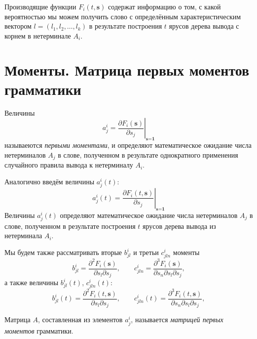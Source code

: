\documentclass[12pt]{article}
\begin{document}
\hrulefill

\begin{footnotesize}
Производящие функции $F_i(t, \textbf{s})$ содержат информацию о том, с какой вероятностью мы можем получить слово с определённым характеристическим вектором $l = (l_1, l_2, \ldots, l_k)$ в результате построения $t$ ярусов дерева вывода с корнем в нетерминале $A_i$.
\end{footnotesize}

\hrulefill

\section{Моменты. Матрица первых моментов грамматики}

Величины
\begin{equation}
	a^i_j = \left.\frac{\partial F_i(\textbf{s})}{\partial s_j}\right|_{\textbf{s} = \textbf{1}}
\end{equation}
называеются \textit{первыми моментами}, и определяют математическое ожидание числа нетерминалов $A_j$ в слове, полученном в результате однократного применения случайного правила вывода к нетерминалу $A_i$.

Аналогично введём величины $a^i_j(t)$:
\begin{equation}
	a^i_j(t) = \left.\frac{\partial F_i(t, \textbf{s})}{\partial s_j}\right|_{\textbf{s} = \textbf{1}}
\end{equation}
Величины $a^i_j(t)$ определяют математическое ожидание числа нетерминалов $A_j$ в слове, полученном в результате построения $t$ ярусов дерева вывода из нетерминала $A_i$.

Мы будем также рассматривать вторые $b^i_{jl}$ и третьи $c^i_{jln}$ моменты
\begin{equation}
	b^i_{jl} = \frac{\partial^2 F_i(\textbf{s})}{\partial s_l \partial s_j},\qquad c^i_{jln} = \frac{\partial^3 F_i(\textbf{s})}{\partial s_n \partial s_l \partial s_j},
\end{equation}
а также величины $b^i_{jl}(t)$, $c^i_{jln}(t)$:
\begin{equation}
	b^i_{jl}(t) = \frac{\partial^2 F_i(t, \textbf{s})}{\partial s_l \partial s_j},\qquad c^i_{jln}(t) = \frac{\partial^3 F_i(t, \textbf{s})}{\partial s_n \partial s_l \partial s_j},
\end{equation}

Матрица $A$, составленная из элементов $a^i_j$, называется \textit{матрицей первых моментов} грамматики.
\end{document}

